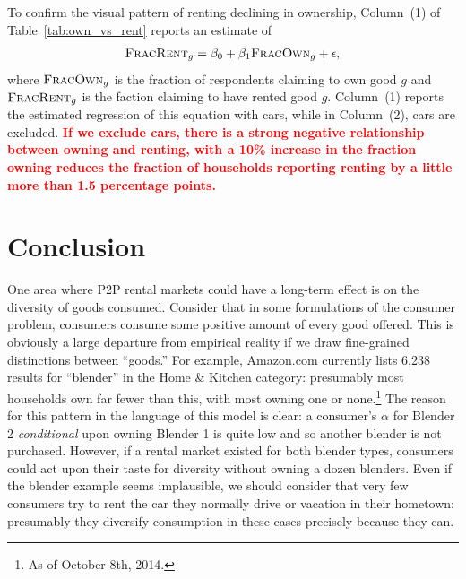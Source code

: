 \documentclass[11pt]{article}
\newcommand{\important}[1]{\textcolor{red}{\textbf{#1}}}
\newcommand{\important}[1]{#1}
\begin{document}
To confirm the visual pattern of renting declining in ownership, Column~(1) of Table~\ref{tab:own_vs_rent} reports an estimate of 
\begin{align}
\textsc{FracRent}_g = \beta_0 + \beta_1 \textsc{FracOwn}_g + \epsilon,  
\end{align} 
where $\textsc{FracOwn}_g$ is the fraction of respondents claiming to own good $g$ and $\textsc{FracRent}_g$ is the faction claiming to have rented good $g$.
Column~(1) reports the estimated regression of this equation with cars, while in Column~(2), cars are excluded.
\important{If we exclude cars, there is a strong negative relationship between owning and renting, with a 10\% increase in the fraction owning reduces the fraction of households reporting renting by a little more than 1.5 percentage points. }

\section{Conclusion} 

One area where P2P rental markets could have a long-term effect is on the diversity of goods consumed. 
Consider that in some formulations of the consumer problem, consumers consume some positive amount of every good offered.
This is obviously a large departure from empirical reality if we draw fine-grained distinctions between ``goods.'' 
For example, Amazon.com currently lists 6,238 results for ``blender'' in the Home \& Kitchen category: 
presumably most households own far fewer than this, with most owning one or none.\footnote{As of October 8th, 2014.}
The reason for this pattern in the language of this model is clear: 
a consumer's $\alpha$ for Blender 2 \emph{conditional} upon owning Blender 1 is quite low and so another blender is not purchased.
However, if a rental market existed for both blender types, consumers could act upon their taste for diversity without owning a dozen blenders. 
Even if the blender example seems implausible, we should consider that very few consumers try to rent the car they normally drive or vacation in their hometown: presumably they diversify consumption in these cases precisely because they can. 
\end{document}

